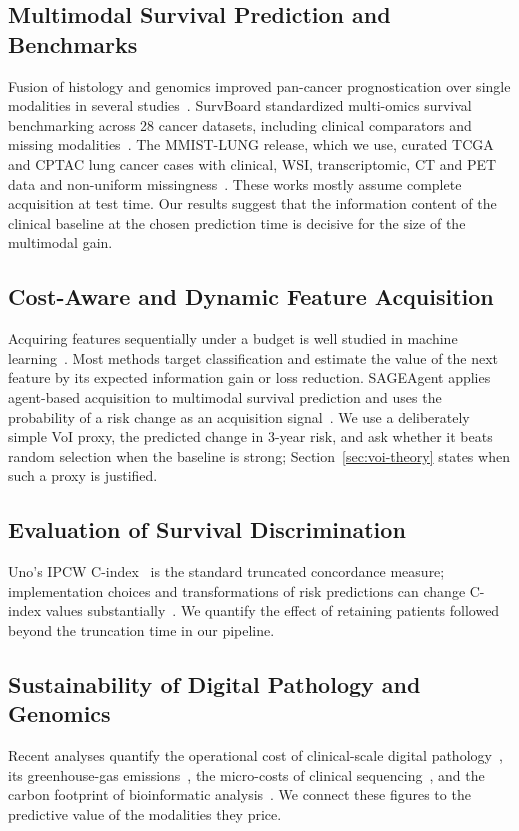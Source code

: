 \documentclass[journal,twoside]{IEEEtran}
\begin{document}
\subsection{Multimodal Survival Prediction and Benchmarks}
Fusion of histology and genomics improved pan-cancer prognostication over single modalities in several studies~\cite{chen2022,cheerla2019,valesilva2021}. SurvBoard standardized multi-omics survival benchmarking across 28 cancer datasets, including clinical comparators and missing modalities~\cite{wissel2025}. The MMIST-LUNG release, which we use, curated TCGA and CPTAC lung cancer cases with clinical, WSI, transcriptomic, CT and PET data and non-uniform missingness~\cite{mendes_mmist}. These works mostly assume complete acquisition at test time. Our results suggest that the information content of the clinical baseline at the chosen prediction time is decisive for the size of the multimodal gain.

\subsection{Cost-Aware and Dynamic Feature Acquisition}
Acquiring features sequentially under a budget is well studied in machine learning~\cite{ji2007,shim2018,covert2023}. Most methods target classification and estimate the value of the next feature by its expected information gain or loss reduction. SAGEAgent applies agent-based acquisition to multimodal survival prediction and uses the probability of a risk change as an acquisition signal~\cite{qu2026}. We use a deliberately simple VoI proxy, the predicted change in 3-year risk, and ask whether it beats random selection when the baseline is strong; Section~\ref{sec:voi-theory} states when such a proxy is justified.

\subsection{Evaluation of Survival Discrimination}
Uno's IPCW C-index~\cite{uno2011} is the standard truncated concordance measure; implementation choices and transformations of risk predictions can change C-index values substantially~\cite{sonabend2022}. We quantify the effect of retaining patients followed beyond the truncation time in our pipeline.

\subsection{Sustainability of Digital Pathology and Genomics}
Recent analyses quantify the operational cost of clinical-scale digital pathology~\cite{ardon2023}, its greenhouse-gas emissions~\cite{tilmant2026,vafaeisadr2024}, the micro-costs of clinical sequencing~\cite{altburger2026,cuppen2022,kumar2022}, and the carbon footprint of bioinformatic analysis~\cite{grealey2022}. We connect these figures to the predictive value of the modalities they price.
\end{document}
